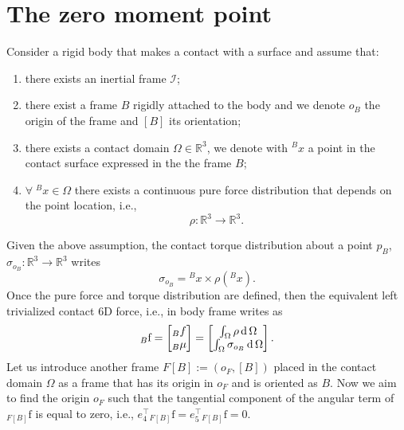 
\section{The zero moment point}\label{sec:zmp}
Consider a rigid body that makes a contact with a surface and assume that:
\begin{enumerate}
    \item there exists an inertial frame $\mathcal{I}$;
    \item there exist a frame $B$ rigidly attached to the body and we denote $o_B$ the origin of the frame and $[B]$ its orientation;
    \item there exists a contact domain $\Omega \in \mathbb{R}^3$, we denote with ${}^B x$ a point in the contact surface expressed in the the frame $B$;
    \item $\forall \; {}^B x \in \Omega$ there exists a continuous pure force distribution that depends on the point location, i.e.,
    \begin{equation}
        \rho : \mathbb{R}^3 \longrightarrow \mathbb{R}^3.
    \end{equation}
\end{enumerate}
Given the above assumption, the contact torque distribution about a point $p_B$, $\sigma_{o_B} :  \mathbb{R}^3 \longrightarrow \mathbb{R}^3$ writes
\begin{equation}
    \sigma_{o_B} = {}^B x \times \rho({}^B x).
\end{equation}
Once the pure force and torque distribution are defined, then the equivalent left trivialized contact 6D force, i.e., in body frame writes as~\citep{Caron2015StabilityAreas}
\begin{equation}
    {}_B \mathrm{f} = \begin{bmatrix}
    {}_B f \\
    {}_B \mu
    \end{bmatrix} = 
    \begin{bmatrix}
    \int_\Omega \rho \operatorname{d} \Omega \\
    \int_\Omega \sigma_{o_B} \operatorname{d} \Omega
    \end{bmatrix}.
\end{equation}
Let us introduce another frame $F[B]:= (o_F, [B])$ placed in the contact domain $\Omega$ as a frame that has its origin in $o_F$ and is oriented as $B$.
Now we aim to find the origin $o_F$ such that the tangential component of the angular term of ${}_{F[B]} \mathrm{f}$ is equal to zero, i.e., $e_4^\top {}_{F[B]} \mathrm{f} = e_5^\top {}_{F[B]} \mathrm{f} = 0$.
